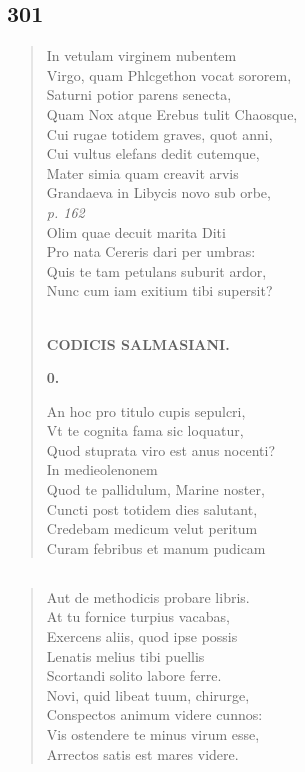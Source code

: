 \documentclass[11pt, a4paper]{report}
\begin{document}
            \subsection*{301}
      \begin{verse}
      In vetulam virginem nubentem \\ Virgo, quam Phlcgethon vocat sororem, \\ Saturni potior parens senecta, \\ Quam Nox atque Erebus tulit Chaosque, \\ Cui rugae totidem graves, quot anni, \\ Cui vultus elefans dedit cutemque, \\ Mater simia quam creavit arvis \\ Grandaeva in Libycis novo sub orbe, \\ \textit{p. 162} \\ Olim quae decuit marita Diti \\ Pro nata Cereris dari per umbras: \\ Quis te tam petulans suburit ardor, \\ Nunc cum iam exitium tibi supersit? \\ 
        ﻿\pagebreak 
    \begin{center} \textbf{CODICIS SALMASIANI.} \end{center} \marginpar{[255]} \begin{center} \textbf{0.} \end{center}An hoc pro titulo cupis sepulcri, \\ Vt te cognita fama sic loquatur, \\ Quod stuprata viro est anus nocenti? \\ In medieolenonem \\ Quod te pallidulum, Marine noster, \\ Cuncti post totidem dies salutant, \\ Credebam medicum velut peritum \\ Curam febribus et manum pudicam \\ 
      \end{verse}
  
            \subsection*{}
      \begin{verse}
      Aut de methodicis probare libris. \\ At tu fornice turpius vacabas, \\ Exercens aliis, quod ipse possis \\ Lenatis melius tibi puellis \\ Scortandi solito labore ferre. \\ Novi, quid libeat tuum, chirurge, \\ Conspectos animum videre cunnos: \\ Vis ostendere te minus virum esse, \\ Arrectos satis est mares videre. \\ 
      \end{verse}
  
\end{document}
